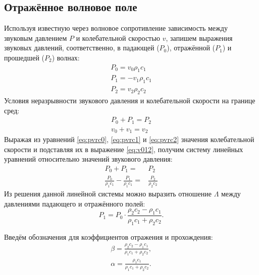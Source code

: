 \documentclass[a4paper, fontsize=14pt]{article}
\begin{document}
	\subsection{Отражённое волновое поле}
	Используя известную через волновое сопротивление зависимость между звуковым давлением $P$ и колебательной скоростью $v$, запишем выражения звуковых давлений, соответственно, в падающей ($P_0$), отражённой ($P_1$) и прошедшей ($P_2$) волнах: \cite{zakharov}
	\begin{eqnarray}
		P_0 = v_0 \rho_1 c_1 \label{eq:pvrc0} \\
		P_1 = - v_1 \rho_1 c_1 \label{eq:pvrc1}\\
		P_2 = v_2 \rho_2 c_2 \label{eq:pvrc2}
	\end{eqnarray}
	Условия неразрывности звукового давления и колебательной скорости на границе сред:
	\begin{eqnarray}
		P_0 + P_1 = P_2 \label{eq:p012}\\
		v_0 + v_1 = v_2 \label{eq:v012}
	\end{eqnarray}
	Выражая из уравнений \ref{eq:pvrc0}, \ref{eq:pvrc1} и \ref{eq:pvrc2} значения колебательной скорости и подставляя их в выражение \ref{eq:v012}, получим систему линейных уравнений относительно значений звукового давления:
	\begin{eqnarray}
		P_0 + P_1 =& P_2 \nonumber\\
		\frac{P_0}{\rho_1 c_1} - \frac{P_1}{\rho_1 c_1} =& \frac{P_2}{\rho_2 c_2} 
	\end{eqnarray}
	Из решения данной линейной системы можно выразить отношение $\Lambda$ между давлениями падающего и отражённого полей:
	\begin{equation}
		P_1 = P_0 \cdot \frac{\rho_2 c_2 - \rho_1 c_1}{\rho_1 c_1 + \rho_2 c_2 }.
		\label{eq:nreflratio}
	\end{equation}
	
	Введём обозначения для коэффициентов отражения и прохождения:
	\begin{gather}
		\beta =  \frac{\rho_2 c_2 - \rho_1 c_1}{\rho_1 c_1 + \rho_2 c_2 },\\
		\alpha =  \frac{\rho_1 c_1}{\rho_1 c_1 + \rho_2 c_2 }.
	\end{gather} 
	
\end{document}
